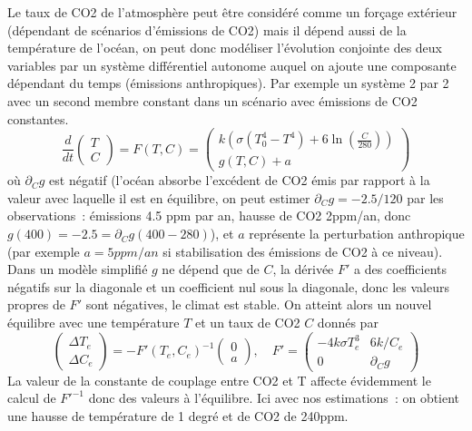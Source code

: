\documentclass[a4paper,11pt]{book}
\begin{document}
\begin{giacjshere}
Le taux de CO2 de l'atmosph\`ere peut \^etre consid\'er\'e comme
un for\c{c}age ext\'erieur (d\'ependant de sc\'enarios d'\'emissions
de CO2) mais il d\'epend aussi de la temp\'erature de l'oc\'ean,
on peut donc mod\'eliser l'\'evolution conjointe des deux
variables par un syst\`eme diff\'erentiel autonome auquel on
ajoute une composante d\'ependant du temps (\'emissions
anthropiques). Par exemple un syst\`eme 2 par 2 avec un second
membre constant dans un sc\'enario avec \'emissions de CO2 constantes.
\[ \frac{d}{dt} \left(\begin{array}{c}
T \\
C
\end{array}\right) =
F(T,C) = \left(\begin{array}{c}
k (\sigma(T_0^4-T^4)+6 \ln(\frac{C}{280})  ) \\
g(T,C) + a
\end{array}\right)
\]
o\`u  $\partial_C g$ est n\'egatif (l'oc\'ean
absorbe l'exc\'edent de CO2 \'emis par rapport \`a la valeur 
avec laquelle il est en \'equilibre, on peut 
estimer $\partial_C g=-2.5/120$ par les observations~: \'emissions 
4.5 ppm par an, hausse de CO2 2ppm/an, donc $g(400)=-2.5=\partial_Cg(400-280)$),
et $a$ repr\'esente la perturbation anthropique (par exemple $a=5ppm/an$
si stabilisation des \'emissions de CO2 \`a ce niveau).
Dans un mod\`ele simplifi\'e $g$ ne d\'epend que de $C$,
la d\'eriv\'ee $F'$ a des coefficients n\'egatifs sur la diagonale et
un coefficient nul sous la diagonale, donc les valeurs propres de $F'$
sont n\'egatives, le climat est stable. On atteint alors un nouvel 
\'equilibre avec une temp\'erature $T$ et un taux de CO2 $C$ donn\'es
par
$$\left(\begin{array}{c} \Delta T_e\\ \Delta C_e \end{array}\right)= -F'(T_e,C_e)^{-1}\left(\begin{array}{c}0\\ a \end{array}\right), \quad
F'=\left(\begin{array}{cc}-4k\sigma T_e^3 & 6k/C_e\\ 0 & \partial_C g
\end{array}\right)$$
La valeur de la constante de couplage entre CO2 et T affecte \'evidemment
le calcul de $F'^{-1}$ donc des valeurs \`a l'\'equilibre.
Ici avec nos estimations~:
on obtient une hausse de temp\'erature de 1 degr\'e et de CO2 de 240ppm.

\end{giacjshere}
\end{document}
